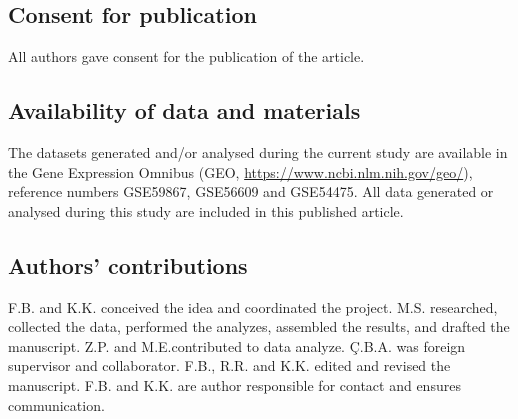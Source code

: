 \documentclass[sn-mathphys,Numbered]{sn-jnl}%
\theoremstyle{thmstyleone}%
\theoremstyle{thmstyletwo}%
\theoremstyle{thmstylethree}%
\begin{document}
\subsection*{Consent for publication}
All authors gave consent for the publication of the article.

\subsection*{Availability of data and materials}
The datasets generated and/or analysed during the current study are available in the Gene Expression Omnibus (GEO, \url{https://www.ncbi.nlm.nih.gov/geo/}), reference numbers GSE59867, GSE56609 and GSE54475. All data generated or analysed during this study are included in this published article.

\subsection*{Authors' contributions}

F.B. and K.K. conceived the idea and coordinated the project.
M.S. researched, collected the data, performed the analyzes, assembled the results, and drafted the manuscript.
Z.P. and M.E.contributed to data analyze.
Ç.B.A. was foreign supervisor and collaborator.
F.B., R.R. and K.K. edited and revised the manuscript.
F.B. and K.K. are author responsible for contact and ensures communication.
\end{document}

